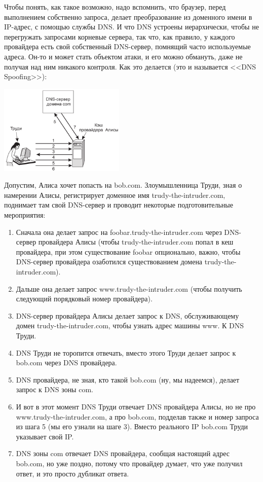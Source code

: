 \documentclass{../../text-style}
\begin{document}
Чтобы понять, как такое возможно, надо вспомнить, что браузер, перед выполнением собственно запроса, делает преобразование из доменного имени в IP-адрес, с помощью службы DNS. И что DNS устроены иерархически, чтобы не перегружать запросами корневые сервера, так что, как правило, у каждого провайдера есть свой собственный DNS-сервер, помнящий часто используемые адреса. Он-то и может стать объектом атаки, и его можно обмануть, даже не получая над ним никакого контроля. Как это делается (это и называется <<DNS Spoofing>>):

\begin{center}
    \includegraphics[width=0.45\textwidth]{dnsSpoofing.png}
\end{center}

Допустим, Алиса хочет попасть на bob.com. Злоумышленница Труди, зная о намерении Алисы, регистрирует доменное имя trudy-the-intruder.com, поднимает там свой DNS-сервер и проводит некоторые подготовительные мероприятия: 

\begin{enumerate}
    \item Сначала она делает запрос на foobar.trudy-the-intruder.com через DNS-сервер провайдера Алисы (чтобы trudy-the-intruder.com попал в кеш провайдера, при этом существование foobar опционально, важно, чтобы DNS-сервер провайдера озаботился существованием домена trudy-the-intruder.com).
    \item Дальше она делает запрос www.trudy-the-intruder.com (чтобы получить следующий порядковый номер провайдера).
    \item DNS-сервер провайдера Алисы делает запрос к DNS, обслуживающему домен trudy-the-intruder.com, чтобы узнать адрес машины www. К DNS Труди.
    \item DNS Труди не торопится отвечать, вместо этого Труди делает запрос к bob.com через DNS провайдера.
    \item DNS провайдера, не зная, кто такой bob.com (ну, мы надеемся), делает запрос к DNS зоны com.
    \item И вот в этот момент DNS Труди отвечает DNS провайдера Алисы, но не про www.trudy-the-intruder.com, а про bob.com, подделав также и номер запроса из шага 5 (мы его узнали на шаге 3). Вместо реального IP bob.com Труди указывает свой IP.
    \item DNS зоны com отвечает DNS провайдера, сообщая настоящий адрес bob.com, но уже поздно, потому что провайдер думает, что уже получил ответ, и это просто дубликат ответа.
\end{enumerate}
\end{document}

